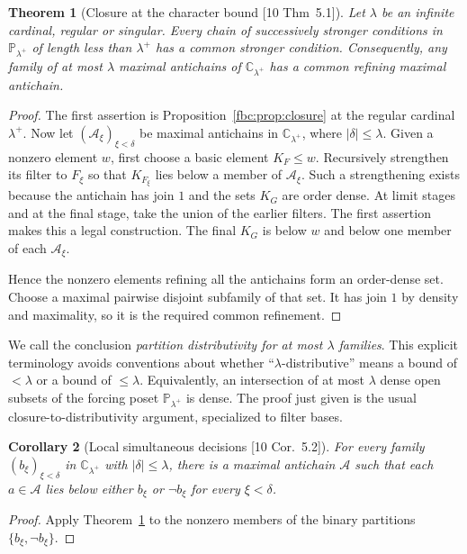 \documentclass[11pt,letterpaper]{article}
\newtheorem{theorem}{Theorem}[section]
\newtheorem{corollary}[theorem]{Corollary}
\theoremstyle{definition}
\theoremstyle{remark}
\newcommand{\C}{\mathbb C}
\newcommand{\PP}{\mathbb P}
\newcommand{\src}[1]{\textup{[#1]}}
\begin{document}
\begin{theorem}[Closure at the character bound \src{10 Thm~5.1}]
\label{fbc:thm:closure}
Let $\lambda$ be an infinite cardinal, regular or singular. Every chain
of successively stronger conditions in $\PP_{\lambda^+}$ of length less
than $\lambda^+$ has a common stronger condition. Consequently, any
family of at most $\lambda$ maximal antichains of $\C_{\lambda^+}$ has a
common refining maximal antichain.
\end{theorem}
\begin{proof}
The first assertion is Proposition~\ref{fbc:prop:closure} at the regular
cardinal $\lambda^+$. Now let $(\mathcal A_\xi)_{\xi<\delta}$ be maximal
antichains in $\C_{\lambda^+}$, where $|\delta|\leq\lambda$. Given a
nonzero element $w$, first choose a basic element $K_F\leq w$.
Recursively strengthen its filter to $F_\xi$ so that $K_{F_\xi}$ lies
below a member of $\mathcal A_\xi$. Such a strengthening exists because
the antichain has join $1$ and the sets $K_G$ are order dense. At limit
stages and at the final stage, take the union of the earlier filters.
The first assertion makes this a legal construction. The final $K_G$ is
below $w$ and below one member of each $\mathcal A_\xi$.

Hence the nonzero elements refining all the antichains form an order-dense
set. Choose a maximal pairwise disjoint subfamily of that set. It has join
$1$ by density and maximality, so it is the required common refinement.
\end{proof}

We call the conclusion \emph{partition distributivity for at most
$\lambda$ families}. This explicit terminology avoids conventions about
whether ``$\lambda$-distributive'' means a bound of $<\lambda$ or a bound
of $\leq\lambda$. Equivalently, an intersection of at most $\lambda$
dense open subsets of the forcing poset $\PP_{\lambda^+}$ is dense. The
proof just given is the usual closure-to-distributivity argument,
specialized to filter bases.

\begin{corollary}[Local simultaneous decisions \src{10 Cor.~5.2}]
\label{fbc:cor:decisions}
For every family $(b_\xi)_{\xi<\delta}$ in $\C_{\lambda^+}$ with
$|\delta|\leq\lambda$, there is a maximal antichain $\mathcal A$ such
that each $a\in\mathcal A$ lies below either $b_\xi$ or $\neg b_\xi$
for every $\xi<\delta$.
\end{corollary}
\begin{proof}
Apply Theorem~\ref{fbc:thm:closure} to the nonzero members of the binary
partitions $\{b_\xi,\neg b_\xi\}$.
\end{proof}
\end{document}
